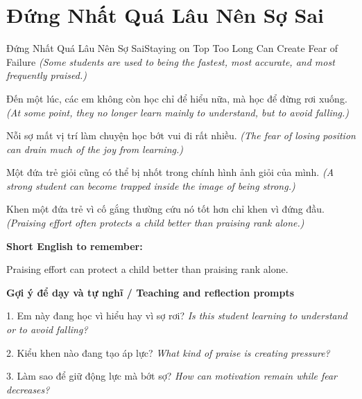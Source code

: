 \section{Đứng Nhất Quá Lâu Nên Sợ Sai}
\begin{truyen}{Đứng Nhất Quá Lâu Nên Sợ Sai}{Staying on Top Too Long Can Create Fear of Failure}
\textit{(Some students are used to being the fastest, most accurate, and most frequently praised.)}

Đến một lúc, các em không còn học chỉ để hiểu nữa, mà học để đừng rơi xuống.
\textit{(At some point, they no longer learn mainly to understand, but to avoid falling.)}

Nỗi sợ mất vị trí làm chuyện học bớt vui đi rất nhiều.
\textit{(The fear of losing position can drain much of the joy from learning.)}

Một đứa trẻ giỏi cũng có thể bị nhốt trong chính hình ảnh giỏi của mình.
\textit{(A strong student can become trapped inside the image of being strong.)}

\end{truyen}

\begin{baihoc}
Khen một đứa trẻ vì cố gắng thường cứu nó tốt hơn chỉ khen vì đứng đầu.
\textit{(Praising effort often protects a child better than praising rank alone.)}
\end{baihoc}

\begin{ghinhoanh}
\textbf{Short English to remember:}

Praising effort can protect a child better than praising rank alone.

\end{ghinhoanh}

\begin{tuhocnhanh}
\textbf{Gợi ý để dạy và tự nghĩ / Teaching and reflection prompts}

1. Em này đang học vì hiểu hay vì sợ rơi? \textit{Is this student learning to understand or to avoid falling?}

2. Kiểu khen nào đang tạo áp lực? \textit{What kind of praise is creating pressure?}

3. Làm sao để giữ động lực mà bớt sợ? \textit{How can motivation remain while fear decreases?}
\end{tuhocnhanh}
\ngancach

